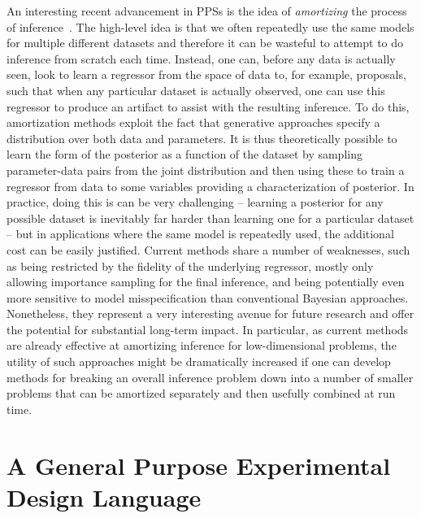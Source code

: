 An interesting recent advancement in PPSs is the idea of \emph{amortizing} the process of 
inference~\citep{paige2016inference,ritchie2016deep,le2017inference}.  The  high-level idea is that  
we often repeatedly use the same models for multiple different datasets and therefore
it can be wasteful to attempt to do inference from scratch each time.  Instead, one can, before any data is
actually seen, look to learn a regressor from the space of data to, for example, proposals, such that
when any particular dataset is actually observed, one can use this regressor to produce an
artifact to assist with the resulting inference.  To do this, amortization methods exploit the fact that generative
approaches specify a distribution over both data and parameters.  It is thus theoretically possible
to learn the form of the posterior as a function of the dataset by sampling parameter-data pairs from
the joint distribution and then using these to train a regressor from data to some variables providing a characterization of
posterior.  In practice, doing this is can be very challenging -- learning a posterior for any possible
dataset is inevitably far harder than learning one for a particular dataset -- but in applications where
the same model is repeatedly used, the additional cost can be easily justified.  Current methods share
a number of weaknesses, such as being restricted by the fidelity of the underlying regressor, mostly
only allowing importance sampling for the final inference, and being potentially even more sensitive to
model misspecification than conventional Bayesian approaches.  Nonetheless, they represent a very interesting avenue
for future research and offer the potential for substantial long-term impact.  In particular, as current methods
are already effective at amortizing inference for low-dimensional problems, the utility of such approaches
might be dramatically increased if one can develop methods for breaking an overall inference problem down
into a number of smaller problems that can be amortized separately and then usefully combined at run time.

\section{A General Purpose Experimental Design Language}
\label{sec:disc:design}

